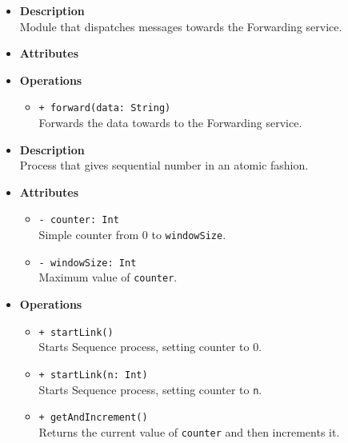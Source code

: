 \FloatBarrier
\begin{itemize}
  \item \textbf{Description} \\
    Module that dispatches messages towards the Forwarding service.
  \item \textbf{Attributes}
  \item \textbf{Operations}
  \begin{itemize}
    \item \texttt{+ forward(data: String)} \\
    Forwards the data towards to the Forwarding service.
  \end{itemize}
\end{itemize}

\FloatBarrier
\begin{itemize}
  \item \textbf{Description} \\
    Process that gives sequential number in an atomic fashion.
  \item \textbf{Attributes}
    \begin{itemize}
      \item \texttt{- counter: Int} \\
    Simple counter from $0$ to \texttt{windowSize}.
      \item \texttt{- windowSize: Int} \\
    Maximum value of \texttt{counter}.
    \end{itemize}
  \item \textbf{Operations}
  \begin{itemize}
    \item \texttt{+ startLink()} \\
    Starts Sequence process, setting counter to $0$.
    \item \texttt{+ startLink(n: Int)} \\
    Starts Sequence process, setting counter to \texttt{n}.
    \item \texttt{+ getAndIncrement()} \\
    Returns the current value  of \texttt{counter} and then increments it.
  \end{itemize}
\end{itemize}


